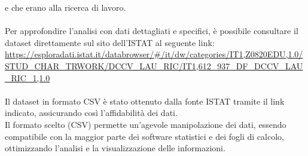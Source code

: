 \documentclass[14pt, openany, titlepage]{report} %
\begin{document}
e che erano alla ricerca di lavoro. \\\\
\noindent
Per approfondire l'analisi con dati dettagliati e specifici, è possibile consultare il dataset direttamente sul sito dell'ISTAT al seguente link:
\url{https://esploradati.istat.it/databrowser/#/it/dw/categories/IT1,Z0820EDU,1.0/STUD_CHAR_TRWORK/DCCV_LAU_RIC/IT1,612_937_DF_DCCV_LAU_RIC_1,1.0}\\\\
\noindent
Il dataset in formato CSV è stato ottenuto dalla fonte ISTAT tramite il link indicato, assicurando così l'affidabilità dei dati.\\
Il formato scelto (CSV) permette un'agevole manipolazione dei dati, essendo compatibile con la maggior parte dei software statistici e
dei fogli di calcolo, ottimizzando l'analisi e la visualizzazione delle informazioni.
\end{document}
